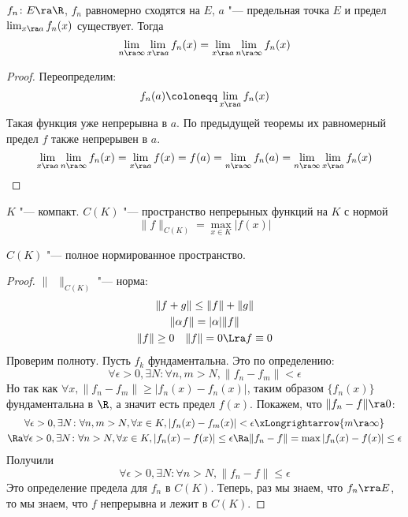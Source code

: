 \begin{conseq}
	$f_n\colon E \ra \R$, $f_n$ равномерно сходятся на $E$, $a$ "--- предельная точка $E$ и предел $\lim_{x \ra a} f_n(x)$ существует.
	Тогда
	\[ \lim_{n \ra \infty} \lim_{x \ra a} f_n(x) = \lim_{x \ra a} \lim_{n \ra \infty} f_n(x) \]
\end{conseq}
\begin{proof}
	Переопределим:
	\[ f_n(a) \coloneqq \lim_{x \ra a} f_n(x) \]
	Такая функция уже непрерывна в $a$.
	По предыдущей теоремы их равномерный предел $f$ также непрерывен в $a$.
	\[
		\lim_{x \ra a} \lim_{n \ra \infty} f_n(x)
		= \lim_{x \ra a} f(x)
		= f(a)
		= \lim_{n \ra \infty} f_n(a)
		= \lim_{n \ra \infty} \lim_{x \ra a} f_n(x)
	\]
\end{proof}

\begin{Def}
	$K$ "--- компакт. $C(K)$ "--- пространство непрерыных функций на $K$ с нормой
	\[ \|f\|_{C(K)} = \max_{x \in K} |f(x)| \]
\end{Def}
\begin{theorem}
	$C(K)$ "--- полное нормированное пространство.
\end{theorem}
\begin{proof}
	$\|\phantom{f}\|_{C(K)}$ "--- норма:
	\begin{gather*}
		\| f + g \| \le \| f \| + \| g \| \\
		\| \alpha f \| = |\alpha| \| f \| \\
		\| f \| \ge 0 \quad \| f \| = 0 \Lra f \equiv 0
	\end{gather*}
	Проверим полноту.
	Пусть $f_k$ фундаментальна.
	Это по определению:
	\[ \forall \epsilon > 0, \exists N\colon \forall n,m > N, \| f_n - f_m \| < \epsilon \]
	Но так как $\forall x, \| f_n - f_m \| \ge |f_n(x) - f_n(x)|$, таким образом $\{f_n(x)\}$ фундаментальна в $\R$, а значит есть предел $f(x)$.
	Покажем, что $\| f_n - f \| \ra 0$:
	\begin{gather*}
		\forall \epsilon > 0, \exists N\colon \forall n,m > N, \forall x \in K, |f_n(x) - f_m(x)| < \epsilon \xLongrightarrow{m \ra \infty} \\
		\Ra \forall \epsilon > 0, \exists N\colon \forall n > N, \forall x \in K, |f_n(x) - f(x)| \le \epsilon
		\Ra \| f_n - f \| = \max |f_n(x) - f(x)| \le \epsilon
	\end{gather*}
	Получили
	\[ \forall \epsilon > 0, \exists N\colon \forall n > N, \| f_n - f \| \le \epsilon \]
	Это определение предела для $f_n$ в $C(K)$.
	Теперь, раз мы знаем, что $f_n \rra E$, то мы знаем, что $f$ непрерывна и лежит в $C(K)$.
\end{proof}

